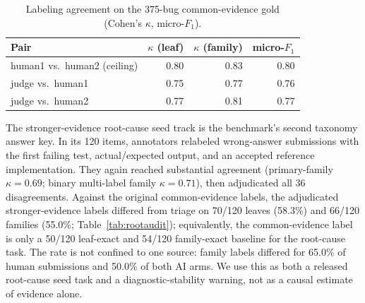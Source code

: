 \documentclass[conference]{IEEEtran}
\begin{document}
\begin{table}[t]
\centering
\caption{Labeling agreement on the 375-bug common-evidence gold (Cohen's $\kappa$,
micro-$F_1$).}
\label{tab:kappa}
\begin{tabular}{lrrr}
\toprule
Pair & $\kappa$ (leaf) & $\kappa$ (family) & micro-$F_1$\\
\midrule
human1 vs.\ human2 (ceiling) & 0.80 & 0.83 & 0.80\\
judge vs.\ human1 & 0.75 & 0.77 & 0.76\\
judge vs.\ human2 & 0.77 & 0.81 & 0.77\\
\bottomrule
\end{tabular}
\end{table}

The stronger-evidence root-cause seed track is the benchmark's second taxonomy answer key.
In its 120 items, annotators relabeled wrong-answer submissions with the first failing
test, actual/expected output, and an accepted reference implementation. They again reached substantial agreement
(primary-family $\kappa=0.69$; binary multi-label family $\kappa=0.71$), then
adjudicated all 36 disagreements. Against the original common-evidence labels, the
adjudicated stronger-evidence labels differed from triage on 70/120 leaves (58.3\%) and 66/120 families
(55.0\%; Table~\ref{tab:rootaudit}); equivalently, the common-evidence label is only
a 50/120 leaf-exact and 54/120 family-exact baseline for the root-cause task. The rate is not confined to one source: family
labels differed for 65.0\% of human submissions and 50.0\% of both AI arms. We use
this as both a released root-cause seed task and a diagnostic-stability warning, not
as a causal estimate of evidence alone.
\end{document}
